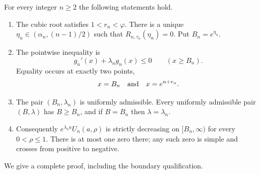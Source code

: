 \begin{theorem}
\label{opt:thm:optimal}
For every integer $n\geq2$ the following statements hold.
\begin{enumerate}
\item The cubic root satisfies $1<r_n<\varphi$. There is a unique
 $\eta_n\in(\alpha_n,(n-1)/2)$ such that
 $R_{n,\tau_n}(\eta_n)=0$. Put $B_n=e^{\eta_n}$.
\item The pointwise inequality is
 \begin{equation}\label{opt:eq:pointwise}
  g_n'(x)+\lambda_n g_n(x)\leq0\qquad(x\geq B_n).
 \end{equation}
 Equality occurs at exactly two points,
 \begin{equation}\label{opt:eq:equality-points}
  x=B_n\quad\hbox{and}\quad x=e^{n+r_n}.
 \end{equation}
\item The pair $(B_n,\lambda_n)$ is uniformly admissible. Every
 uniformly admissible pair $(B,\lambda)$ has $B\geq B_n$, and if
 $B=B_n$ then $\lambda=\lambda_n$.
\item Consequently $e^{\lambda_n a}U_n(a,\rho)$ is strictly decreasing
 on $[B_n,\infty)$ for every $0<\rho\leq1$. There is at most one
 zero there; any such zero is simple and crosses from positive to
 negative.
\end{enumerate}
\end{theorem}

We give a complete proof, including the boundary qualification.

